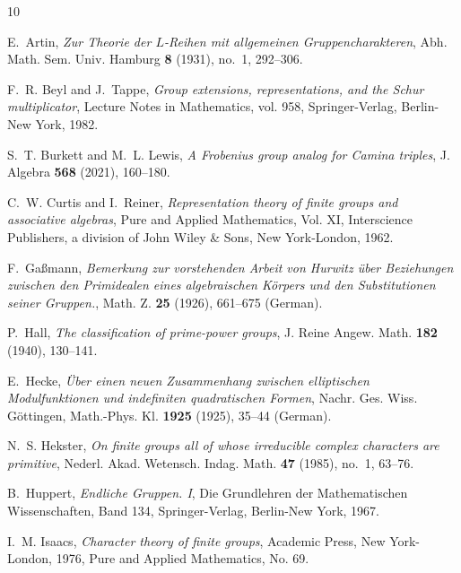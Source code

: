 \documentclass[a4paper,12pt]{article}
\theoremstyle{definition}
\theoremstyle{remark}
\numberwithin{equation}{section}
\begin{document}
%
%

\providecommand{\bysame}{\leavevmode\hbox to3em{\hrulefill}\thinspace}
\begin{thebibliography}{10}

E.~Artin, \emph{Zur {T}heorie der {$L$}-{R}eihen mit allgemeinen
  {G}ruppencharakteren}, Abh. Math. Sem. Univ. Hamburg \textbf{8} (1931),
  no.~1, 292--306.

F.~R. Beyl and J.~Tappe, \emph{Group extensions, representations, and the
  {S}chur multiplicator}, Lecture Notes in Mathematics, vol. 958,
  Springer-Verlag, Berlin-New York, 1982.

S.~T. Burkett and M.~L. Lewis, \emph{A {F}robenius group analog for {C}amina
  triples}, J. Algebra \textbf{568} (2021), 160--180.

C.~W. Curtis and I.~Reiner, \emph{Representation theory of finite groups and
  associative algebras}, Pure and Applied Mathematics, Vol. XI, Interscience
  Publishers, a division of John Wiley \& Sons, New York-London, 1962.

F.~Ga{\ss}mann, \emph{Bemerkung zur vorstehenden {Arbeit} von {Hurwitz}
  {\"u}ber {Beziehungen} zwischen den {Primidealen} eines algebraischen
  {K{\"o}rpers} und den {Substitutionen} seiner {Gruppen}.}, Math. Z.
  \textbf{25} (1926), 661--675 (German).

P.~Hall, \emph{The classification of prime-power groups}, J. Reine Angew. Math.
  \textbf{182} (1940), 130--141.

E.~{Hecke}, \emph{{\"Uber einen neuen Zusammenhang zwischen elliptischen
  Modulfunktionen und indefiniten quadratischen Formen}}, {Nachr. Ges. Wiss.
  G\"ottingen, Math.-Phys. Kl.} \textbf{1925} (1925), 35--44 (German).

N.~S. Hekster, \emph{On finite groups all of whose irreducible complex
  characters are primitive}, Nederl. Akad. Wetensch. Indag. Math. \textbf{47}
  (1985), no.~1, 63--76.

B.~Huppert, \emph{Endliche {G}ruppen. {I}}, Die Grundlehren der Mathematischen
  Wissenschaften, Band 134, Springer-Verlag, Berlin-New York, 1967.

I.~M. Isaacs, \emph{Character theory of finite groups}, Academic Press, New
  York-London, 1976, Pure and Applied Mathematics, No. 69.


\end{thebibliography}
\end{document}
